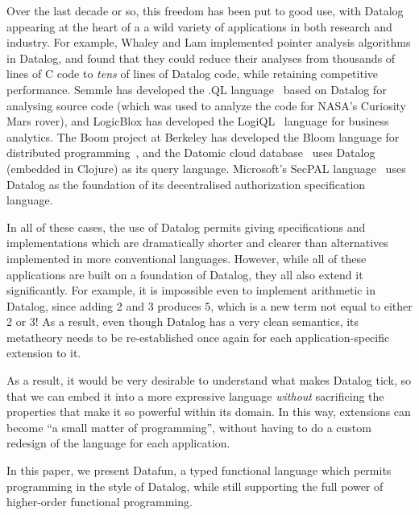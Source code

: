 Over the last decade or so, this freedom has been put to good use, with Datalog
appearing at the heart of a a wild variety of applications in both research and
industry. For example, Whaley and Lam \cite{whaley-lam,whaley-phd} implemented
pointer analysis algorithms in Datalog, and found that they could reduce their
analyses from thousands of lines of C code to \emph{tens} of lines of Datalog
code, while retaining competitive performance. Semmle has developed the .QL
language~\cite{semmlecode,ql-inference} based on Datalog for analysing source
code (which was used to analyze the code for NASA's Curiosity Mars rover), and
LogicBlox has developed the LogiQL~\cite{logicblox} language for business
analytics. The Boom project at Berkeley has developed the Bloom language for
distributed programming~\cite{bloom}, and the Datomic cloud
database~\cite{datomic} uses Datalog (embedded in Clojure) as its query
language. Microsoft's SecPAL language~\cite{secpal} uses Datalog as the
foundation of its decentralised authorization specification language.

In all of these cases, the use of Datalog permits giving specifications and
implementations which are dramatically shorter and clearer than alternatives
implemented in more conventional languages. However, while all of these
applications are built on a foundation of Datalog, they all also extend it
significantly. For example, it is impossible even to implement arithmetic in
Datalog, since adding 2 and 3 produces 5, which is a new term not equal to
either 2 or 3! As a result, even though Datalog has a very clean semantics, its
metatheory needs to be re-established once again for each application-specific
extension to it.

As a result, it would be very desirable to understand what makes Datalog tick,
so that we can embed it into a more expressive language \emph{without}
sacrificing the properties that make it so powerful within its domain. In this
way, extensions can become ``a small matter of programming'', without having to
do a custom redesign of the language for each application.

In this paper, we present Datafun, a typed functional language which permits
programming in the style of Datalog, while still supporting the full power of
higher-order functional programming.

